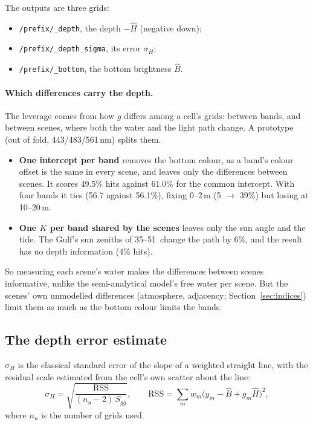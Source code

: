 \documentclass[11pt]{article}
\numberwithin{equation}{section}
\newcommand{\code}[1]{\texttt{#1}}
\begin{document}
The outputs are three grids:
\begin{itemize}
\item \code{/prefix/\_depth}, the depth $-\hat H$ (negative down);
\item \code{/prefix/\_depth\_sigma}, its error $\sigma_H$;
\item \code{/prefix/\_bottom}, the bottom brightness $\hat B$.
\end{itemize}

\paragraph{Which differences carry the depth.} The leverage comes from how $g$ differs among a
cell's grids: between bands, and between scenes, where both the water and the light path change.
A prototype (out of fold, 443/483/561\,nm) splits them.
\begin{itemize}
\item \textbf{One intercept per band} removes the bottom colour, as a band's colour offset is the
  same in every scene, and leaves only the differences between scenes. It scores 49.5\% hits
  against 61.0\% for the common intercept. With four bands it ties (56.7 against 56.1\%), fixing
  0--2\,m (5 $\to$ 39\%) but losing at 10--20\,m.
\item \textbf{One $K$ per band shared by the scenes} leaves only the sun angle and the tide. The
  Gulf's sun zeniths of 35--51\textdegree\ change the path by 6\%, and the result has no depth
  information (4\% hits).
\end{itemize}
So measuring each scene's water makes the differences between scenes informative, unlike the
semi-analytical model's free water per scene. But the scenes' own unmodelled differences
(atmosphere, adjacency; Section~\ref{sec:indices}) limit them as much as the bottom colour limits
the bands.

\subsection{The depth error estimate}
\label{sec:att_error}

$\sigma_H$ is the classical standard error of the slope of a weighted straight line, with the
residual scale estimated from the cell's own scatter about the line:
\begin{equation}
  \sigma_H = \sqrt{\frac{\mathrm{RSS}}{(n_u - 2)\,S_{gg}}}, \qquad
  \mathrm{RSS} = \sum_m w_m \bigl(y_m - \hat B + g_m \hat H\bigr)^2 ,
  \label{eq:sigmaH}
\end{equation}
where $n_u$ is the number of grids used.
\end{document}
